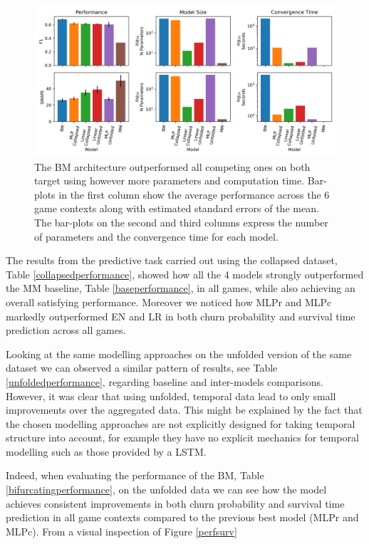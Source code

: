 \begin{figure}[h]
\centering
\includegraphics[width=.7\textwidth]{images/chapter_3/global_31.png}
\caption[\textbf{Aggregated comparison of models' performance}]{The BM architecture outperformed all competing ones on both target using however more parameters and computation time. Bar-plots in the first column show the average performance across the 6 game contexts along with estimated standard errors of the mean. The bar-plots on the second and third columns express the number of parameters and the convergence time for each model.}
\label{model_comp_coll_31} 
\end{figure}


The results from the predictive task carried out using the collapsed dataset, Table \ref{collapsedperformance}, showed how all the 4 models strongly outperformed the MM baseline, Table \ref{baseperformance}, in all games, while also achieving an overall satisfying performance. Moreover we noticed how MLPr and MLPc markedly outperformed EN and LR in both churn probability and survival time prediction across all games.  



Looking at the same modelling approaches on the unfolded version of the same dataset we can observed a similar pattern of results, see Table \ref{unfoldedperformance}, regarding baseline and inter-models comparisons. However, it was clear that using unfolded, temporal data lead to only small improvements over the aggregated data. This might be explained by the fact that the chosen modelling approaches are not explicitly designed for taking temporal structure into account, for example they have no explicit mechanics for temporal modelling such as those provided by a LSTM.



Indeed, when evaluating the performance of the BM, Table \ref{bifurcatingperformance}, on the unfolded data we can see how the model achieves consistent improvements in both churn probability and survival time prediction in all game contexts compared to the previous best model (MLPr and MLPc). From a visual inspection of Figure \ref{perfsurv} 

